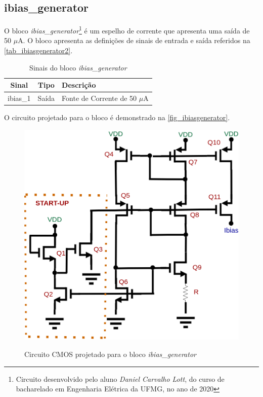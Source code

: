 \renewcommand{\NomeBloco}{\textit{ibias\_generator}}
\renewcommand{\NomeBlocoNoUnderline}{ibiasgenerator}
\renewcommand{\NomePTab}{tab_\NomeBlocoNoUnderline}
\renewcommand{\NomeSTab}{tab_\NomeBlocoNoUnderline2}
\renewcommand{\NomePFig}{fig_\NomeBlocoNoUnderline}
\renewcommand{\NomeSFig}{fig_\NomeBlocoNoUnderline2}
\renewcommand{\NomeTTab}{tab_\NomeBlocoNoUnderline3}
\renewcommand{\NomeQTab}{tab_\NomeBlocoNoUnderline4}

\subsection{ibias\_generator}
 
O bloco \NomeBloco{}\footnote{Circuito desenvolvido pelo aluno \textit{Daniel Carvalho Lott}, do curso de bacharelado em Engenharia Elétrica da UFMG, no ano de 2020} \'e um espelho de corrente que apresenta uma sa\'ida de 50 $\mu$A. O bloco apresenta as definições de sinais de entrada e sa\'ida referidos na \autoref{\NomeSTab}.

\begin{table}[!h]
\caption{Sinais do bloco \NomeBloco}
\label{\NomeSTab}
\centering
\begin{tabular}{ccl}

    \toprule
    Sinal & Tipo    & Descrição        \\
    \midrule \midrule
    ibias\_1   & Saída   & Fonte de Corrente de 50 $\mu$A \\
    \bottomrule
\end{tabular}
\end{table}

O circuito projetado para o bloco \'e demonstrado na \autoref{\NomePFig}.

\begin{figure}[htb]
 \centering
    \centering
    \caption{Circuito CMOS projetado para o bloco \NomeBloco} 
    \includegraphics[scale=0.3]{Circuitos/Ibias_generator.png}
    \label{\NomePFig}
\end{figure}

